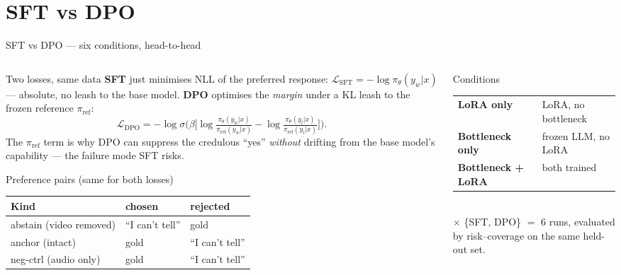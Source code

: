 \documentclass[10pt,aspectratio=169]{beamer}
\begin{document}
\section{SFT vs DPO}

\begin{frame}{SFT vs DPO --- six conditions, head-to-head}

\begin{columns}[T]
\begin{column}{0.48\textwidth}

\begin{block}{Two losses, same data}
{\footnotesize
\textbf{SFT} just minimises NLL of the preferred response:
$\mathcal L_{\text{SFT}}=-\log\pi_\theta(y_w|x)$ --- absolute, no leash to the
base model. \textbf{DPO} optimises the \emph{margin} under a KL leash to the
frozen reference $\pi_{\text{ref}}$:
\[
\mathcal L_{\text{DPO}}=-\log\sigma\!\Big(\beta\big[\log\tfrac{\pi_\theta(y_w|x)}{\pi_{\text{ref}}(y_w|x)}-\log\tfrac{\pi_\theta(y_l|x)}{\pi_{\text{ref}}(y_l|x)}\big]\Big).
\]
The $\pi_{\text{ref}}$ term is why DPO can suppress the credulous ``yes''
\emph{without} drifting from the base model's capability --- the failure mode SFT
risks.}
\end{block}

\begin{block}{Preference pairs (same for both losses)}
{\footnotesize
\begin{tabular}{l p{1.5cm} p{1.5cm}}
\toprule
\textbf{Kind} & \textbf{chosen} & \textbf{rejected} \\
\midrule
abstain (video removed) & ``I can't tell'' & gold \\
anchor (intact) & gold & ``I can't tell'' \\
neg-ctrl (audio only) & gold & ``I can't tell'' \\
\bottomrule
\end{tabular}}
\end{block}

\end{column}

\begin{column}{0.48\textwidth}

\begin{block}{Conditions}
{\footnotesize
\begin{tabular}{l p{3.7cm}}
\toprule
\textbf{LoRA only} & LoRA, no bottleneck \\
\rowcolor{paperC!8}
\textbf{Bottleneck only} & frozen LLM, no LoRA \\
\textbf{Bottleneck + LoRA} & both trained \\
\bottomrule
\end{tabular}
\\[3pt]
$\times$ \{SFT, DPO\} $=$ 6 runs, evaluated by risk--coverage on the same
held-out set.}
\end{block}


\end{column}
\end{columns}
\end{frame}
\end{document}
